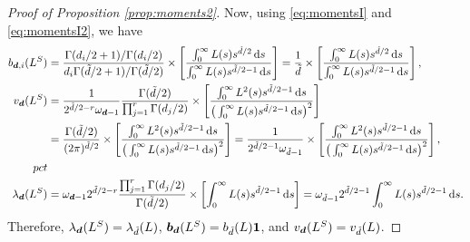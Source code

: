 \documentclass[oneside,11pt]{article}
\begin{document}
\begin{proof}[Proof of Proposition \ref{prop:moments2}]
Now, using \eqref{eq:momentsI} and \eqref{eq:momentsI2}, we have
\begin{align*}
    b_{\bd,i}(L^S)%
    &= \frac{\Gamma(d_i/2+1)/\Gamma(d_i/2)}{d_i\Gamma(\tilde{d}/2+1)/\Gamma(\tilde{d}/2)} \times\left[\frac{\int_{0}^{\infty} L(s) s^{\tilde{d} / 2} \,\rd s}{\int_{0}^{\infty} L(s) s^{\tilde{d} / 2-1} \,\rd s}\right]
    =\frac{1}{\tilde{d}}\times \left[\frac{\int_{0}^{\infty} L(s) s^{\tilde{d} / 2} \,\rd s}{\int_{0}^{\infty} L(s) s^{\tilde{d} / 2-1} \,\rd s}\right],\\
    v_{\bd}(L^S)%
    &=\frac{1}{2^{\tilde{d} / 2-r} \omega_{\bd-1}} \frac{\Gamma(\tilde{d}/2)}{\prod_{j=1}^r \Gamma(d_j/2)}\times\left[\frac{\int_{0}^{\infty} L^2(s)s^{\tilde{d} / 2-1} \,\rd s}{\big(\int_{0}^{\infty} L(s) s^{\tilde{d} / 2-1} \,\rd s\big)^{2}}\right]\\
    &=\frac{\Gamma(\tilde{d}/2)}{(2\pi)^{\tilde{d}/2}}\times \left[\frac{\int_{0}^{\infty} L^2(s)s^{\tilde{d} / 2-1} \,\rd s}{\big(\int_{0}^{\infty} L(s) s^{\tilde{d} / 2-1} \,\rd s\big)^{2}}\right]%
    =\frac{1}{2^{\tilde{d}/2-1}\omega_{\tilde{d}-1}}\times \left[\frac{\int_{0}^{\infty} L^2(s)s^{\tilde{d} / 2-1} \,\rd s}{\big(\int_{0}^{\infty} L(s) s^{\tilde{d} / 2-1} \,\rd s\big)^{2}}\right],\\pct\\
    \lambda_{\bd}(L^S)%
    &=\om{\bd-1}2^{\tilde{d}/2-r}  \frac{\prod_{j=1}^r \Gamma(d_j/2)}{\Gamma(\tilde{d}/2)}\times \left[\int_{0}^{\infty} L(s) s^{\tilde{d} / 2-1} \,\rd s\right]%
    =\omega_{\tilde{d}-1}2^{\tilde{d}/2-1}  \int_{0}^{\infty} L(s) s^{\tilde{d} / 2-1} \,\rd s.%
\end{align*}
Therefore, $\lambda_{\boldsymbol{d}}(L^S)=\lambda_{\tilde{d}}(L)$, $\boldsymbol{b}_{\boldsymbol{d}}(L^S)= b_{\tilde{d}}(L)\mathbf{1}$, and $v_{\boldsymbol{d}}(L^S)=v_{\tilde{d}}(L)$.
\end{proof}
\end{document}
